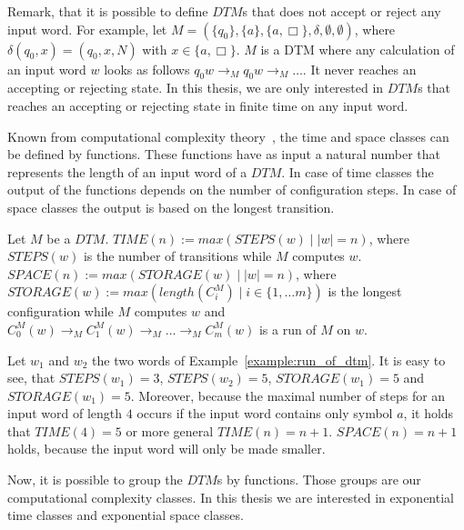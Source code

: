 Remark, that it is possible to define $\mathit{DTM}$s that does not accept or reject any input word. For example, let
$M = (\{q_0\}, \{a\}, \{a, \Box\}, \delta, \emptyset, \emptyset)$, where $\delta(q_0, x) = (q_0, x, N)$ with $x \in
\{a, \Box\}$. $M$ is a DTM where any calculation of an input word $w$ looks as follows $q_0w \rightarrow_M q_0w
\rightarrow_M \dots$. It never reaches an accepting or rejecting state. In this thesis, we are only interested in
$\mathit{DTM}$s that reaches an accepting or rejecting state in finite time on any input word.

Known from computational complexity theory~\cite{papadimitriou1994complexity}, the time and space classes
can be defined by functions. These functions have as input a natural number that represents the length of an input
word of a $\mathit{DTM}$. In case of time classes the output of the functions depends on the number of configuration
steps. In case of space classes the output is based on the longest transition.

\begin{definition}
    Let $M$ be a $\mathit{DTM}$. $\mathit{TIME}(n):= max(\mathit{STEPS}(w)\mid |w| = n)$, where $\mathit{STEPS}(w)$
    is the number of transitions while $M$ computes $w$. $\mathit{SPACE}(n) := max(\mathit{STORAGE}(w)\mid |w| = n)$,
    where $\mathit{STORAGE}(w) := max(length(C_i^M)\mid i\in\{1, \dots m\})$ is the longest configuration while $M$
    computes $w$ and $C_0^M(w) \rightarrow_M C_1^M(w) \rightarrow_M \dots \rightarrow_M C_m^M(w)$ is a run of $M$ on
    $w$.
\end{definition}

\begin{example}
    \label{example:time_and_space}
    Let $w_1$ and $w_2$ the two words of Example~\ref{example:run_of_dtm}. It is easy to see, that $\mathit{STEPS}(w_1)
    = 3$, $\mathit{STEPS}(w_2) = 5$, $\mathit{STORAGE}(w_1) = 5$ and $\mathit{STORAGE}(w_1) = 5$. Moreover, because
    the maximal number of steps for an input word of length $4$ occurs if the input word contains only symbol $a$, it
    holds that $\mathit{TIME}(4) = 5$ or more general $\mathit{TIME}(n) = n + 1$. $\mathit{SPACE}(n) = n + 1$ holds,
    because the input word will only be made smaller.
\end{example}

Now, it is possible to group the $\mathit{DTM}$s by functions. Those groups are our computational complexity classes.
In this thesis we are interested in exponential time classes and exponential space classes.

